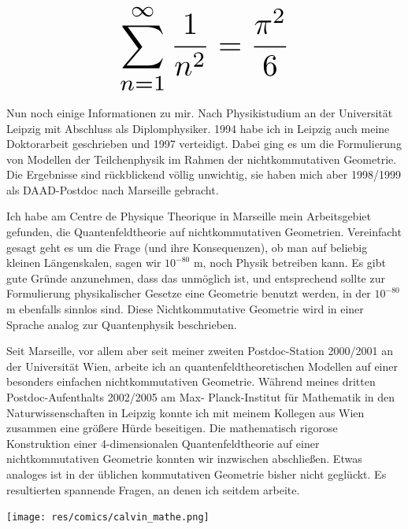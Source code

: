 \begin{multicols}{2}
\[
\resizebox{0.45\hsize}{!}{$\displaystyle\sum_{n = 1}^\infty \frac{1}{n^2} = \frac{\pi^2}{6}$}
\]

Nun noch einige Informationen zu mir. Nach Physikistudium an der Universität Leipzig mit Abschluss als Diplomphysiker. 1994 habe ich in Leipzig auch meine Doktorarbeit geschrieben und 1997 verteidigt. Dabei ging es um die Formulierung von Modellen der Teilchenphysik im Rahmen der nichtkommutativen Geometrie. Die Ergebnisse sind rückblickend völlig unwichtig, sie haben mich aber 1998/1999 als DAAD-Postdoc nach Marseille gebracht.

Ich habe am Centre de Physique Theorique in Marseille mein Arbeitsgebiet gefunden, die Quantenfeldtheorie auf nichtkommutativen Geometrien. Vereinfacht gesagt geht es um die Frage (und ihre Konsequenzen), ob man auf beliebig kleinen Längenskalen, sagen wir $10^{-80}$ m, noch Physik betreiben kann. Es gibt gute Gründe anzunehmen, dass das unmöglich ist, und entsprechend sollte zur Formulierung physikalischer Gesetze eine Geometrie benutzt werden, in der $10^{-80}$ m ebenfalls sinnlos sind. Diese Nichtkommutative Geometrie wird in einer Sprache analog zur Quantenphysik beschrieben.

Seit Marseille, vor allem aber seit meiner zweiten Postdoc-Station 2000/2001 an der Universität Wien, arbeite ich an quantenfeldtheoretischen Modellen auf einer besonders einfachen nichtkommutativen Geometrie. Während meines dritten Postdoc-Aufenthalts 2002/2005 am Max- Planck-Institut für Mathematik in den Naturwissenschaften in Leipzig konnte ich mit meinem Kollegen aus Wien zusammen eine größere Hürde beseitigen. Die mathematisch rigorose Konstruktion einer 4-dimensionalen Quantenfeldtheorie auf einer nichtkommutativen Geometrie konnten wir inzwischen abschließen. Etwas analoges ist in der üblichen kommutativen Geometrie bisher nicht geglückt. Es resultierten spannende Fragen, an denen ich seitdem arbeite.

\begin{center}
\texttt{[image: res/comics/calvin\_mathe.png]}
\end{center}
\end{multicols}
